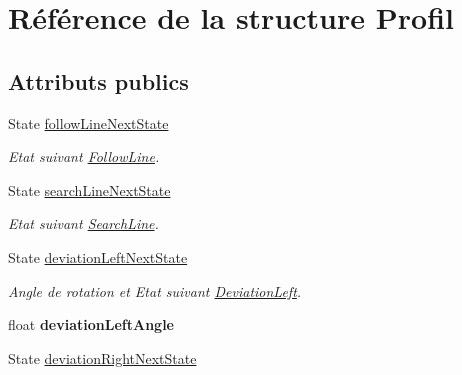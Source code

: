 \hypertarget{struct_profil}{\section{Référence de la structure Profil}
\label{struct_profil}
}
\subsection*{Attributs publics}
\begin{DoxyCompactItemize}
\item 
\hypertarget{struct_profil_ad431b0565e961c5c4a5c77870af1074c}{State \hyperlink{struct_profil_ad431b0565e961c5c4a5c77870af1074c}{follow\-Line\-Next\-State}}\label{struct_profil_ad431b0565e961c5c4a5c77870af1074c}

\begin{DoxyCompactList}\small\item\em Etat suivant \hyperlink{class_follow_line}{Follow\-Line}. \end{DoxyCompactList}\item 
\hypertarget{struct_profil_ac5e8bd0586dc24bc135ea8e734c5a80d}{State \hyperlink{struct_profil_ac5e8bd0586dc24bc135ea8e734c5a80d}{search\-Line\-Next\-State}}\label{struct_profil_ac5e8bd0586dc24bc135ea8e734c5a80d}

\begin{DoxyCompactList}\small\item\em Etat suivant \hyperlink{class_search_line}{Search\-Line}. \end{DoxyCompactList}\item 
\hypertarget{struct_profil_a0773d26148537b1f7e1942b601424e89}{State \hyperlink{struct_profil_a0773d26148537b1f7e1942b601424e89}{deviation\-Left\-Next\-State}}\label{struct_profil_a0773d26148537b1f7e1942b601424e89}

\begin{DoxyCompactList}\small\item\em Angle de rotation et Etat suivant \hyperlink{class_deviation_left}{Deviation\-Left}. \end{DoxyCompactList}\item 
\hypertarget{struct_profil_ae443c15040258f32e17148b75b96d536}{float {\bfseries deviation\-Left\-Angle}}\label{struct_profil_ae443c15040258f32e17148b75b96d536}

\item 
\hypertarget{struct_profil_a77e9bd9b9bf7b060fc87c1dd6a030166}{State \hyperlink{struct_profil_a77e9bd9b9bf7b060fc87c1dd6a030166}{deviation\-Right\-Next\-State}}\label{struct_profil_a77e9bd9b9bf7b060fc87c1dd6a030166}


\end{DoxyCompactItemize}
